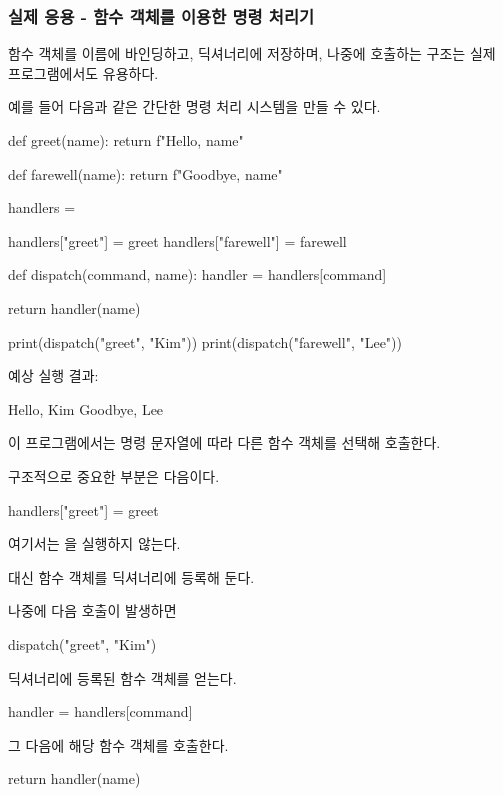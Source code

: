 \subsubsection{실제 응용 - 함수 객체를 이용한 명령 처리기}

함수 객체를 이름에 바인딩하고, 딕셔너리에 저장하며, 나중에 호출하는 구조는 실제 프로그램에서도 유용하다.

예를 들어 다음과 같은 간단한 명령 처리 시스템을 만들 수 있다.

\begin{dhkcode}
def greet(name):
    return f"Hello, {name}"

def farewell(name):
    return f"Goodbye, {name}"

handlers = {}

handlers["greet"] = greet
handlers["farewell"] = farewell

def dispatch(command, name):
    handler = handlers[command]

    return handler(name)

print(dispatch("greet", "Kim"))
print(dispatch("farewell", "Lee"))
\end{dhkcode}

예상 실행 결과:

\begin{dhkzsh}
Hello, Kim
Goodbye, Lee
\end{dhkzsh}

이 프로그램에서는 명령 문자열에 따라 다른 함수 객체를 선택해 호출한다.

구조적으로 중요한 부분은 다음이다.

\begin{dhkcode}
handlers["greet"] = greet
\end{dhkcode}

여기서는 을 실행하지 않는다.

대신  함수 객체를 딕셔너리에 등록해 둔다.

나중에 다음 호출이 발생하면

\begin{dhkcode}
dispatch("greet", "Kim")
\end{dhkcode}

딕셔너리에 등록된 함수 객체를 얻는다.

\begin{dhkcode}
handler = handlers[command]
\end{dhkcode}

그 다음에 해당 함수 객체를 호출한다.

\begin{dhkcode}
return handler(name)
\end{dhkcode}

